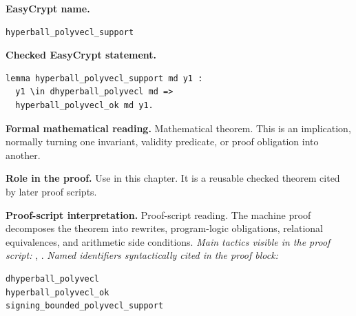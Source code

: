 \begin{formaltheorem}
\noindent\textbf{EasyCrypt name.}
\begin{lstlisting}[language=EasyCrypt,basicstyle=\ttfamily\scriptsize]
hyperball_polyvecl_support
\end{lstlisting}
\noindent\textbf{Checked EasyCrypt statement.}
\begin{lstlisting}[language=EasyCrypt,basicstyle=\ttfamily\scriptsize]
lemma hyperball_polyvecl_support md y1 :
  y1 \in dhyperball_polyvecl md =>
  hyperball_polyvecl_ok md y1.
\end{lstlisting}
\noindent\textbf{Formal mathematical reading.}
Mathematical theorem. This is an implication, normally turning one invariant, validity predicate, or proof obligation into another.

\noindent\textbf{Role in the proof.}
Use in this chapter. It is a reusable checked theorem cited by later proof scripts.

\noindent\textbf{Proof-script interpretation.}
Proof-script reading. The machine proof decomposes the theorem into rewrites, program-logic obligations, relational equivalences, and arithmetic side conditions.
\emph{Main tactics visible in the proof script:} , .
\emph{Named identifiers syntactically cited in the proof block:}
\begin{lstlisting}[language=EasyCrypt,basicstyle=\ttfamily\scriptsize]
dhyperball_polyvecl
hyperball_polyvecl_ok
signing_bounded_polyvecl_support
\end{lstlisting}

\end{formaltheorem}

